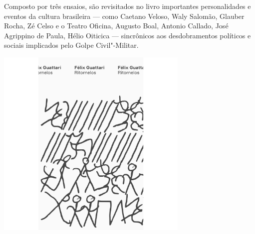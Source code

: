 Composto por três ensaios, são revisitados no livro importantes personalidades e eventos da cultura brasileira --- como Caetano Veloso, Waly Salomão, Glauber Rocha, Zé Celso e o Teatro Oficina, Augusto Boal, Antonio Callado, José Agrippino de Paula, Hélio Oiticica --- sincrônicos aos desdobramentos políticos e sociais implicados pelo Golpe Civil"-Militar.

\vfill

\hspace*{-.4cm}\begin{minipage}[c]{.5\linewidth}
\small{
{}}
\end{minipage}

\pagebreak

\hspace{.5cm}

\begin{center}
\hspace*{.5cm}\includegraphics[width=92mm]{./grid/guattari.jpg}
\end{center}

\hspace*{-7cm}\hrulefill\hspace*{-7cm}

